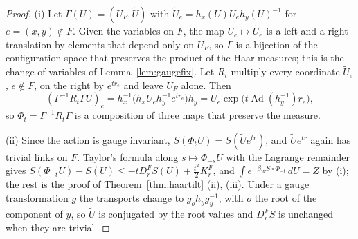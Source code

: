 \documentclass[11pt]{amsart}
\theoremstyle{definition}
\theoremstyle{remark}
\numberwithin{equation}{section}
\begin{document}
\begin{proof}
(i) Let $\Gamma(U)=(U_F,\tilde U)$ with $\tilde U_e=h_x(U)U_eh_y(U)^{-1}$
for $e=(x,y)\notin F$. Given the variables on $F$, the map $U_e\mapsto
\tilde U_e$ is a left and a right translation by elements that depend only
on $U_F$, so $\Gamma$ is a bijection of the configuration space that preserves the
product of the Haar measures; this is the change of variables of
Lemma~\ref{lem:gaugefix}. Let $R_t$ multiply every coordinate $\tilde U_e$,
$e\notin F$, on the right by $e^{tr_e}$ and leave $U_F$ alone. Then
\[
(\Gamma^{-1}R_t\Gamma U)_e=h_x^{-1}\bigl(h_xU_eh_y^{-1}e^{tr_e}\bigr)h_y
=U_e\exp\bigl(t\operatorname{Ad}(h_y^{-1})r_e\bigr),
\]
so $\Phi_t=\Gamma^{-1}R_t\Gamma$ is a composition of three maps that
preserve the measure.

(ii) Since the action is gauge invariant, $S(\Phi_tU)=S(\tilde Ue^{tr})$,
and $\tilde Ue^{tr}$ again has trivial links on $F$. Taylor's formula
along $s\mapsto\Phi_{-s}U$ with the Lagrange remainder gives $S(\Phi_{-t}
U)-S(U)\le-tD^F_rS(U)+\frac{t^2}2K^F_r$, and $\int e^{-\beta_WS\circ\Phi_
{-t}}\,dU=Z$ by (i); the rest is the proof of Theorem~\ref{thm:haartilt}
(ii), (iii). Under a gauge transformation $g$ the transports change to
$g_oh_yg_y^{-1}$, with $o$ the root of the component of $y$, so $\tilde U$
is conjugated by the root values and $D^F_rS$ is unchanged when they are
trivial.


\end{proof}
\end{document}
